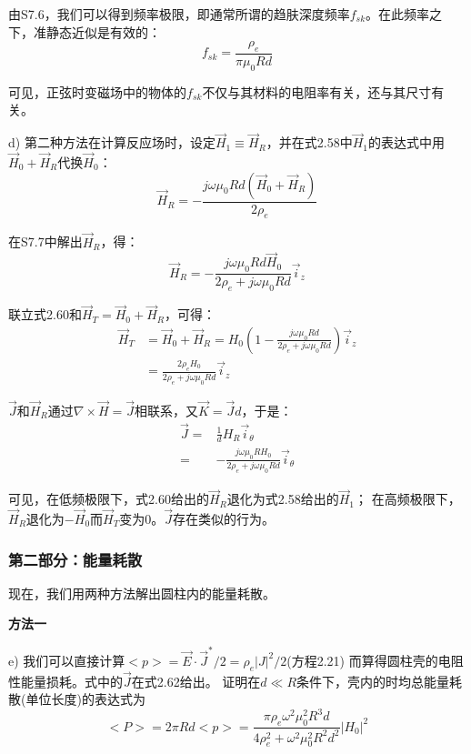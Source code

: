 由S7.6，我们可以得到频率极限，即通常所谓的趋肤深度频率$f_{sk}$。在此频率之下，准静态近似是有效的：
\begin{equation*}
f_{sk}=\frac{\rho_e}{\pi \mu_0 R d} \tag{2.59}
\end{equation*}

可见，正弦时变磁场中的物体的$f_{sk}$不仅与其材料的电阻率有关，还与其尺寸有关。

d) 第二种方法在计算反应场时，设定$\vec{H}_1\equiv \vec{H}_R$，并在式2.58中$\vec{H}_1$的表达式中用$\vec{H}_0+\vec{H}_R$代换$\vec{H}_0$：
\begin{equation*}
\vec{H}_R=-\frac{j\omega \mu_0 R d (\vec{H}_0+\vec{H}_R)}{2\rho_e} \tag{S7.7}
\end{equation*}

在S7.7中解出$\vec{H}_R$，得：
\begin{equation*}
\vec{H}_R=-\frac{j\omega \mu_0 R d \vec{H}_0}{2\rho_e+j\omega \mu_0 R d}\vec{i}_z \tag{2.60}
\end{equation*}

联立式2.60和$\vec{H}_T=\vec{H}_0+\vec{H}_R$，可得：
\begin{align}
\vec{H}_T&=\vec{H}_0+\vec{H}_R=H_0\left(1-\frac{j\omega\mu_0 R d}{2\rho_e+j\omega\mu_0 Rd}\right)\vec{i}_z\nonumber\\
&=\frac{2\rho_e H_0}{2\rho_e+j\omega \mu_0 R d}\vec{i}_z\nonumber\tag{2.61}
\end{align}

$\vec{J}$和$\vec{H}_R$通过$\nabla\times \vec{H}=\vec{J}$相联系，又$\vec{K}=\vec{J}d$，于是：
\begin{align}
\vec{J}=&\frac{1}{d}H_R \vec{i}_\theta \nonumber\tag{S7.8}\\
=&-\frac{j\omega \mu_0 R H_0}{2\rho_e+j\omega \mu_0 R d}\vec{i}_\theta\nonumber\tag{2.62}
\end{align}

可见，在低频极限下，式2.60给出的$\vec{H}_R$退化为式2.58给出的$\vec{H}_1$；
在高频极限下，$\vec{H}_R$退化为$-\vec{H}_0$而$\vec{H}_T$变为$0$。$\vec{J}$存在类似的行为。

\subsubsection*{第二部分：能量耗散}
现在，我们用两种方法解出圆柱内的能量耗散。

\textbf{方法一}

e) 我们可以直接计算$<p>=\vec{E}\cdot \vec{J}^* /2=\rho_e |J|^2 /2$(方程2.21)
而算得圆柱壳的电阻性能量损耗。式中的$\vec{J}$在式2.62给出。
证明在$d\ll R$条件下，壳内的时均总能量耗散(单位长度)的表达式为
\begin{equation}
<P>=2\pi R d<p>=\frac{\pi \rho_e \omega^2 \mu_0^2 R^3 d}{4\rho_e^2+\omega^2\mu_0^2 R^2 d^2} |H_0|^2
\end{equation}

